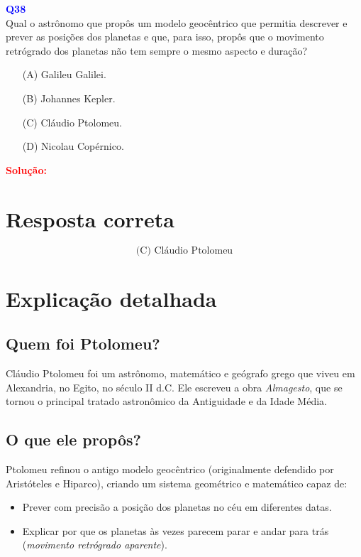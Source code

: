 \documentclass[a4paper,12pt]{article}
\begin{document}
\begin{flushleft}
\textbf{\textcolor{blue}{\Large Q38}}\\
\noindent
\colorbox{green!30}{Qual o astrônomo que propôs um modelo geocêntrico que
permitia descrever e prever} \colorbox{green!30}{as posições dos planetas e que, para isso, propôs que o movimento retrógrado dos planetas}
não tem sempre o mesmo aspecto e duração?

\begin{itemize}
\item[(A)] Galileu Galilei.
\item[(B)] Johannes Kepler.
\item[(C)] Cláudio Ptolomeu.
\item[(D)] Nicolau Copérnico.
\end{itemize}

\vspace{0.5cm}

\textcolor{red}{\textbf{Solução:}}\\

\section*{Resposta correta}

\[
\boxed{\text{(C) Cláudio Ptolomeu}}
\]

\section*{Explicação detalhada}

\subsection*{Quem foi Ptolomeu?}
Cláudio Ptolomeu foi um astrônomo, matemático e geógrafo grego que viveu em Alexandria, no Egito, no século II d.C. Ele escreveu a obra \textit{Almagesto}, que se tornou o principal tratado astronômico da Antiguidade e da Idade Média.

\subsection*{O que ele propôs?}
Ptolomeu refinou o antigo modelo geocêntrico (originalmente defendido por Aristóteles e Hiparco), criando um sistema geométrico e matemático capaz de:
\begin{itemize}
    \item Prever com precisão a posição dos planetas no céu em diferentes datas.
    \item Explicar por que os planetas às vezes parecem parar e andar para trás (\textit{movimento retrógrado aparente}).
\end{itemize}


\end{flushleft}
\end{document}
